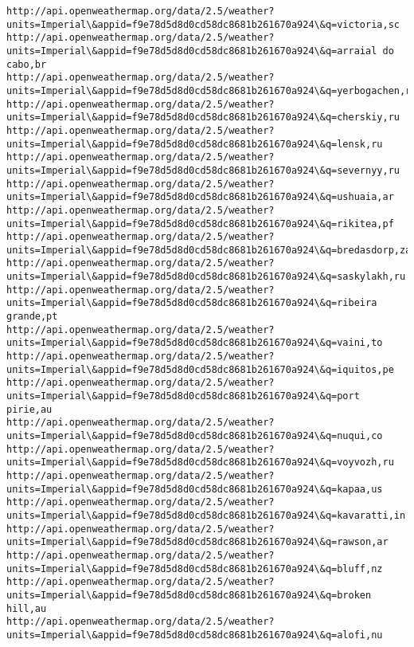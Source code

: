 \documentclass[11pt]{article}
\begin{document}
    \begin{Verbatim}[commandchars=\\\{\}]
http://api.openweathermap.org/data/2.5/weather?units=Imperial\&appid=f9e78d5d8d0cd58dc8681b261670a924\&q=victoria,sc
http://api.openweathermap.org/data/2.5/weather?units=Imperial\&appid=f9e78d5d8d0cd58dc8681b261670a924\&q=arraial do cabo,br
http://api.openweathermap.org/data/2.5/weather?units=Imperial\&appid=f9e78d5d8d0cd58dc8681b261670a924\&q=yerbogachen,ru
http://api.openweathermap.org/data/2.5/weather?units=Imperial\&appid=f9e78d5d8d0cd58dc8681b261670a924\&q=cherskiy,ru
http://api.openweathermap.org/data/2.5/weather?units=Imperial\&appid=f9e78d5d8d0cd58dc8681b261670a924\&q=lensk,ru
http://api.openweathermap.org/data/2.5/weather?units=Imperial\&appid=f9e78d5d8d0cd58dc8681b261670a924\&q=severnyy,ru
http://api.openweathermap.org/data/2.5/weather?units=Imperial\&appid=f9e78d5d8d0cd58dc8681b261670a924\&q=ushuaia,ar
http://api.openweathermap.org/data/2.5/weather?units=Imperial\&appid=f9e78d5d8d0cd58dc8681b261670a924\&q=rikitea,pf
http://api.openweathermap.org/data/2.5/weather?units=Imperial\&appid=f9e78d5d8d0cd58dc8681b261670a924\&q=bredasdorp,za
http://api.openweathermap.org/data/2.5/weather?units=Imperial\&appid=f9e78d5d8d0cd58dc8681b261670a924\&q=saskylakh,ru
http://api.openweathermap.org/data/2.5/weather?units=Imperial\&appid=f9e78d5d8d0cd58dc8681b261670a924\&q=ribeira grande,pt
http://api.openweathermap.org/data/2.5/weather?units=Imperial\&appid=f9e78d5d8d0cd58dc8681b261670a924\&q=vaini,to
http://api.openweathermap.org/data/2.5/weather?units=Imperial\&appid=f9e78d5d8d0cd58dc8681b261670a924\&q=iquitos,pe
http://api.openweathermap.org/data/2.5/weather?units=Imperial\&appid=f9e78d5d8d0cd58dc8681b261670a924\&q=port pirie,au
http://api.openweathermap.org/data/2.5/weather?units=Imperial\&appid=f9e78d5d8d0cd58dc8681b261670a924\&q=nuqui,co
http://api.openweathermap.org/data/2.5/weather?units=Imperial\&appid=f9e78d5d8d0cd58dc8681b261670a924\&q=voyvozh,ru
http://api.openweathermap.org/data/2.5/weather?units=Imperial\&appid=f9e78d5d8d0cd58dc8681b261670a924\&q=kapaa,us
http://api.openweathermap.org/data/2.5/weather?units=Imperial\&appid=f9e78d5d8d0cd58dc8681b261670a924\&q=kavaratti,in
http://api.openweathermap.org/data/2.5/weather?units=Imperial\&appid=f9e78d5d8d0cd58dc8681b261670a924\&q=rawson,ar
http://api.openweathermap.org/data/2.5/weather?units=Imperial\&appid=f9e78d5d8d0cd58dc8681b261670a924\&q=bluff,nz
http://api.openweathermap.org/data/2.5/weather?units=Imperial\&appid=f9e78d5d8d0cd58dc8681b261670a924\&q=broken hill,au
http://api.openweathermap.org/data/2.5/weather?units=Imperial\&appid=f9e78d5d8d0cd58dc8681b261670a924\&q=alofi,nu

\end{Verbatim}
\end{document}
